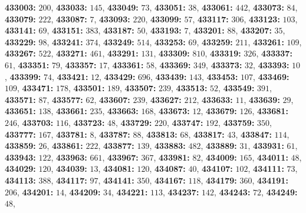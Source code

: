 \textsf{\bfseries 433003:} $200$, \textsf{\bfseries 433033:} $145$, \textsf{\bfseries 433049:} $73$, \textsf{\bfseries 433051:} $38$, \textsf{\bfseries 433061:} $442$, \textsf{\bfseries 433073:} $84$, \textsf{\bfseries 433079:} $222$, \textsf{\bfseries 433087:} $7$, \textsf{\bfseries 433093:} $220$, \textsf{\bfseries 433099:} $57$, \textsf{\bfseries 433117:} $306$, \textsf{\bfseries 433123:} $103$, \textsf{\bfseries 433141:} $69$, \textsf{\bfseries 433151:} $383$, \textsf{\bfseries 433187:} $50$, \textsf{\bfseries 433193:} $7$, \textsf{\bfseries 433201:} $88$, \textsf{\bfseries 433207:} $35$, \textsf{\bfseries 433229:} $98$, \textsf{\bfseries 433241:} $374$, \textsf{\bfseries 433249:} $514$, \textsf{\bfseries 433253:} $69$, \textsf{\bfseries 433259:} $211$, \textsf{\bfseries 433261:} $109$, \textsf{\bfseries 433267:} $522$, \textsf{\bfseries 433271:} $461$, \textsf{\bfseries 433291:} $131$, \textsf{\bfseries 433309:} $810$, \textsf{\bfseries 433319:} $326$, \textsf{\bfseries 433337:} $61$, \textsf{\bfseries 433351:} $79$, \textsf{\bfseries 433357:} $17$, \textsf{\bfseries 433361:} $58$, \textsf{\bfseries 433369:} $349$, \textsf{\bfseries 433373:} $32$, \textsf{\bfseries 433393:} $10$, \textsf{\bfseries 433399:} $74$, \textsf{\bfseries 433421:} $12$, \textsf{\bfseries 433429:} $696$, \textsf{\bfseries 433439:} $143$, \textsf{\bfseries 433453:} $107$, \textsf{\bfseries 433469:} $109$, \textsf{\bfseries 433471:} $178$, \textsf{\bfseries 433501:} $189$, \textsf{\bfseries 433507:} $239$, \textsf{\bfseries 433513:} $52$, \textsf{\bfseries 433549:} $391$, \textsf{\bfseries 433571:} $87$, \textsf{\bfseries 433577:} $62$, \textsf{\bfseries 433607:} $239$, \textsf{\bfseries 433627:} $212$, \textsf{\bfseries 433633:} $11$, \textsf{\bfseries 433639:} $29$, \textsf{\bfseries 433651:} $138$, \textsf{\bfseries 433661:} $235$, \textsf{\bfseries 433663:} $168$, \textsf{\bfseries 433673:} $12$, \textsf{\bfseries 433679:} $126$, \textsf{\bfseries 433681:} $246$, \textsf{\bfseries 433703:} $116$, \textsf{\bfseries 433723:} $48$, \textsf{\bfseries 433729:} $220$, \textsf{\bfseries 433747:} $192$, \textsf{\bfseries 433759:} $350$, \textsf{\bfseries 433777:} $167$, \textsf{\bfseries 433781:} $8$, \textsf{\bfseries 433787:} $88$, \textsf{\bfseries 433813:} $68$, \textsf{\bfseries 433817:} $43$, \textsf{\bfseries 433847:} $114$, \textsf{\bfseries 433859:} $26$, \textsf{\bfseries 433861:} $222$, \textsf{\bfseries 433877:} $139$, \textsf{\bfseries 433883:} $482$, \textsf{\bfseries 433889:} $31$, \textsf{\bfseries 433931:} $61$, \textsf{\bfseries 433943:} $122$, \textsf{\bfseries 433963:} $661$, \textsf{\bfseries 433967:} $367$, \textsf{\bfseries 433981:} $82$, \textsf{\bfseries 434009:} $165$, \textsf{\bfseries 434011:} $48$, \textsf{\bfseries 434029:} $120$, \textsf{\bfseries 434039:} $13$, \textsf{\bfseries 434081:} $120$, \textsf{\bfseries 434087:} $40$, \textsf{\bfseries 434107:} $102$, \textsf{\bfseries 434111:} $73$, \textsf{\bfseries 434113:} $388$, \textsf{\bfseries 434117:} $97$, \textsf{\bfseries 434141:} $350$, \textsf{\bfseries 434167:} $118$, \textsf{\bfseries 434179:} $360$, \textsf{\bfseries 434191:} $206$, \textsf{\bfseries 434201:} $14$, \textsf{\bfseries 434209:} $34$, \textsf{\bfseries 434221:} $113$, \textsf{\bfseries 434237:} $142$, \textsf{\bfseries 434243:} $72$, \textsf{\bfseries 434249:} $48$, 
